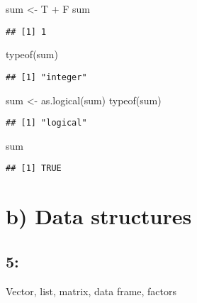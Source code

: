 \documentclass[
]{article}
\newenvironment{Shaded}{\begin{snugshade}}{\end{snugshade}}
\newcommand{\FunctionTok}[1]{\textcolor[rgb]{0.00,0.00,0.00}{#1}}
\newcommand{\NormalTok}[1]{#1}
\newcommand{\OtherTok}[1]{\textcolor[rgb]{0.56,0.35,0.01}{#1}}
\newcommand{\SpecialCharTok}[1]{\textcolor[rgb]{0.00,0.00,0.00}{#1}}
\begin{document}
\begin{Shaded}
\begin{Highlighting}[]
\NormalTok{sum }\OtherTok{\textless{}{-}}\NormalTok{ T }\SpecialCharTok{+}\NormalTok{ F}
\NormalTok{sum}
\end{Highlighting}
\end{Shaded}

\begin{verbatim}
## [1] 1
\end{verbatim}

\begin{Shaded}
\begin{Highlighting}[]
\FunctionTok{typeof}\NormalTok{(sum)}
\end{Highlighting}
\end{Shaded}

\begin{verbatim}
## [1] "integer"
\end{verbatim}

\begin{Shaded}
\begin{Highlighting}[]
\NormalTok{sum }\OtherTok{\textless{}{-}} \FunctionTok{as.logical}\NormalTok{(sum)}
\FunctionTok{typeof}\NormalTok{(sum)}
\end{Highlighting}
\end{Shaded}

\begin{verbatim}
## [1] "logical"
\end{verbatim}

\begin{Shaded}
\begin{Highlighting}[]
\NormalTok{sum}
\end{Highlighting}
\end{Shaded}

\begin{verbatim}
## [1] TRUE
\end{verbatim}

\hypertarget{b-data-structures}{%
\section{b) Data structures}\label{b-data-structures}}

\hypertarget{section-4}{%
\subsection{5:}\label{section-4}}

Vector, list, matrix, data frame, factors
\end{document}
